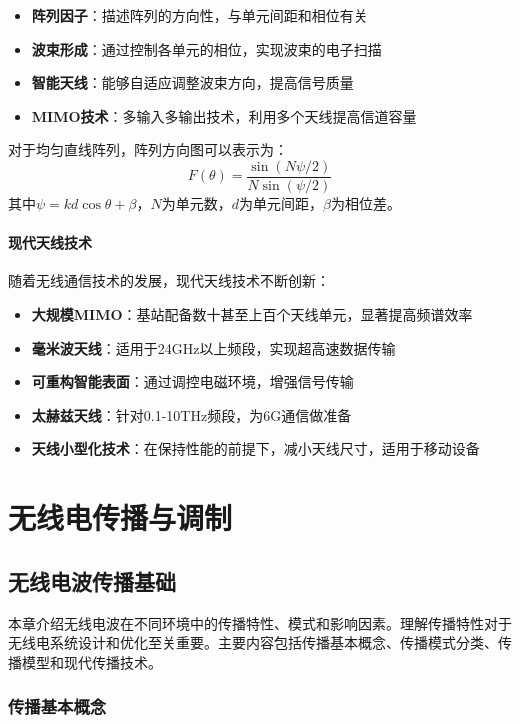 \documentclass[12pt,UTF8]{ctexbook}
\begin{document}
\begin{itemize}[leftmargin=3.5em]
    \item \textbf{阵列因子}：描述阵列的方向性，与单元间距和相位有关
    \item \textbf{波束形成}：通过控制各单元的相位，实现波束的电子扫描
    \item \textbf{智能天线}：能够自适应调整波束方向，提高信号质量
    \item \textbf{MIMO技术}：多输入多输出技术，利用多个天线提高信道容量
\end{itemize}

对于均匀直线阵列，阵列方向图可以表示为：
\[ F(\theta) = \frac{\sin(N\psi/2)}{N\sin(\psi/2)} \]
其中$\psi = kd\cos\theta + \beta$，$N$为单元数，$d$为单元间距，$\beta$为相位差。

\subsection{现代天线技术}

随着无线通信技术的发展，现代天线技术不断创新：

\begin{itemize}[leftmargin=3.5em]
    \item \textbf{大规模MIMO}：基站配备数十甚至上百个天线单元，显著提高频谱效率
    \item \textbf{毫米波天线}：适用于24GHz以上频段，实现超高速数据传输
    \item \textbf{可重构智能表面}：通过调控电磁环境，增强信号传输
    \item \textbf{太赫兹天线}：针对0.1-10THz频段，为6G通信做准备
    \item \textbf{天线小型化技术}：在保持性能的前提下，减小天线尺寸，适用于移动设备
\end{itemize}

\part{无线电传播与调制}

\chapter{无线电波传播基础}
\label{无线电波传播基础}

本章介绍无线电波在不同环境中的传播特性、模式和影响因素。理解传播特性对于无线电系统设计和优化至关重要。主要内容包括传播基本概念、传播模式分类、传播模型和现代传播技术。

\section{传播基本概念}
\end{document}
